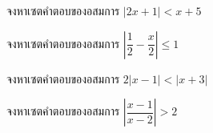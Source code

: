 \begin{examplebox}
	จงหาเซตคำตอบของอสมการ $\left|2x+1\right|< x+5$
\end{examplebox}
\solution
\newpage

\begin{examplebox}
	จงหาเซตคำตอบของอสมการ $\left|\dfrac{1}{2}-\dfrac{x}{2}\right| \leq 1$
\end{examplebox}
\solution
\newpage

\begin{examplebox}
	จงหาเซตคำตอบของอสมการ $2\left|x-1\right|< \left|x+3\right|$
\end{examplebox}
\solution

\newpage
\begin{examplebox}
	จงหาเซตคำตอบของอสมการ $\left|\dfrac{x-1}{x-2}\right|>2$
\end{examplebox}
\solution
\newpage








